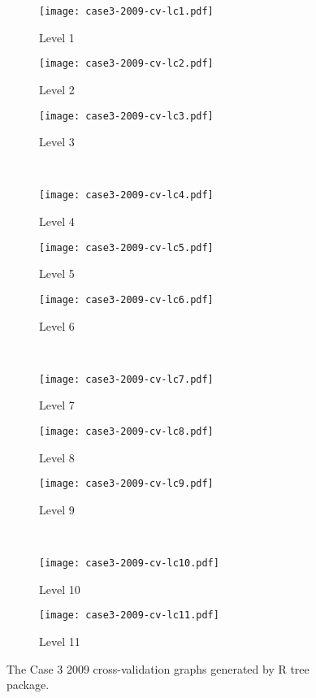 \begin{appendices}
\begin{figure}[!ht] \centering
	\captionsetup[subfigure]{width=2.0in}
	\begin{subfigure}[t]{0.32\textwidth}
		\texttt{[image: case3-2009-cv-lc1.pdf]}
		\caption{Level 1}
	\end{subfigure}
	\begin{subfigure}[t]{0.32\textwidth}
		\texttt{[image: case3-2009-cv-lc2.pdf]}
		\caption{Level 2}
	\end{subfigure}
	\begin{subfigure}[t]{0.32\textwidth}
		\texttt{[image: case3-2009-cv-lc3.pdf]}
		\caption{Level 3}
	\end{subfigure}\\
	\vspace{5pt}
	\begin{subfigure}[t]{0.32\textwidth}
		\texttt{[image: case3-2009-cv-lc4.pdf]}
		\caption{Level 4}
	\end{subfigure}
	\begin{subfigure}[t]{0.32\textwidth}
		\texttt{[image: case3-2009-cv-lc5.pdf]}
		\caption{Level 5}
	\end{subfigure}
	\begin{subfigure}[t]{0.32\textwidth}
		\texttt{[image: case3-2009-cv-lc6.pdf]}
		\caption{Level 6}
	\end{subfigure}\\
	\vspace{5pt}	
	\begin{subfigure}[t]{0.32\textwidth}
		\texttt{[image: case3-2009-cv-lc7.pdf]}
		\caption{Level 7}
	\end{subfigure}
	\begin{subfigure}[t]{0.32\textwidth}
		\texttt{[image: case3-2009-cv-lc8.pdf]}
		\caption{Level 8}
	\end{subfigure}
	\begin{subfigure}[t]{0.32\textwidth}
		\texttt{[image: case3-2009-cv-lc9.pdf]}
		\caption{Level 9}
	\end{subfigure}\\
	\vspace{5pt}
	\begin{subfigure}[t]{0.32\textwidth}
		\texttt{[image: case3-2009-cv-lc10.pdf]}
		\caption{Level 10}
	\end{subfigure}
	\begin{subfigure}[t]{0.32\textwidth}
		\texttt{[image: case3-2009-cv-lc11.pdf]}
		\caption{Level 11}
	\end{subfigure}
	\vspace{5pt}
	\caption[The Case 3 2009 cross-validation graphs generated by R tree package.]{The Case 3 2009 cross-validation graphs generated by R tree package.}
	\label{fig: appendix-fig.c22.cv}
\end{figure}


\end{appendices}

